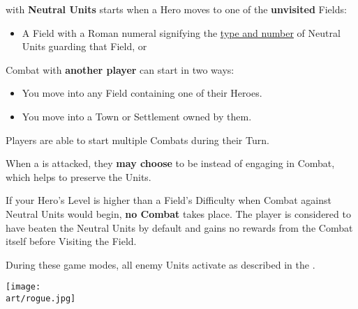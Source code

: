 
\begin{multicols*}{2}

 with \textbf{Neutral Units} starts when a Hero moves to one of the \textbf{unvisited} Fields:
\begin{itemize}
  \item A Field with a Roman numeral signifying the \hyperlink{Difficulty Table}{type and number} of Neutral Units guarding that Field, or
\end{itemize}

Combat with \textbf{another player} can start in two ways:
\begin{itemize}
  \item You move into any Field containing one of their Heroes.
  \item You move into a Town or Settlement owned by them.
\end{itemize}
Players are able to start multiple Combats during their Turn.

When a  is attacked, they \textbf{may choose} to be  instead of engaging in Combat, which helps to preserve the Units.

\vspace*{\fill}
If your Hero's Level is higher than a Field's Difficulty when Combat against Neutral Units would begin, \textbf{no Combat} takes place.
The player is considered to have beaten the Neutral Units by default and gains no rewards from the Combat itself before Visiting the Field.

\vspace*{\fill}
During these game modes, all enemy Units activate as described in the .
\columnbreak

\begin{center}
  \texttt{[image: \\art/rogue.jpg]}
\end{center}
\end{multicols*}

